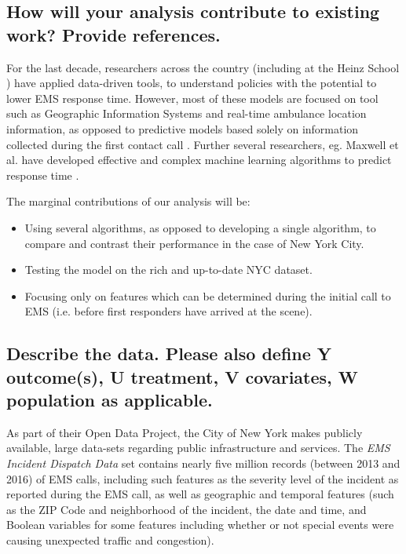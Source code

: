 \documentclass[twoside,11pt]{article}
\begin{document}
\subsection{How will your analysis contribute to existing work? Provide references.}
For the last decade, researchers across the country (including at the Heinz School \cite{yue2012efficient}) have applied data-driven tools, to understand policies with the potential to lower EMS response time. However, most of these models are focused on tool such as Geographic Information Systems and real-time ambulance location information, as opposed to predictive models based solely on information collected during the first contact call \cite{peleg2004geographic}. Further several researchers, eg. Maxwell et al. have developed effective and complex machine learning algorithms to predict response time \cite{maxwell2009ambulance}. \par The marginal contributions of our analysis will be:
\begin{itemize}
    \item Using several algorithms, as opposed to developing a single algorithm, to compare and contrast their performance in the case of New York City.
    \item Testing the model on the rich and up-to-date NYC dataset.
    \item Focusing only on features which can be determined during the initial call to EMS (i.e. before first responders have arrived at the scene).
\end{itemize}

\subsection{Describe the data. Please also define Y outcome(s), U treatment, V covariates, W population as applicable.}

As part of their Open Data Project, the City of New York makes publicly available, large data-sets regarding public infrastructure and services. The \emph{EMS Incident Dispatch Data} set contains nearly five million records (between 2013 and 2016) of EMS calls, including such features as  the severity level of the incident as reported during the EMS call, as well as geographic and temporal features (such as the ZIP Code and neighborhood of the incident, the date and time, and Boolean variables for some features including whether or not special events were causing unexpected traffic and congestion).
\end{document}
